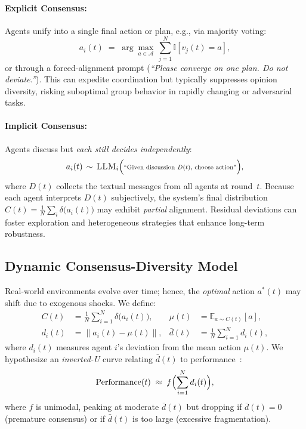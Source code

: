 \paragraph{Explicit Consensus:}
    Agents unify into a single final action or plan, e.g., via majority voting:
    \begin{equation}
    a_i(t) \;=\; \arg\max_{a\in\mathcal{A}} \,\sum_{j=1}^N \mathbb{I}[v_j(t) = a],
    \end{equation}
    or through a forced-alignment prompt (\emph{“Please converge on one plan. Do not deviate.”}). This can expedite coordination but typically suppresses opinion diversity, risking suboptimal group behavior in rapidly changing or adversarial tasks.

\paragraph{Implicit Consensus:}
    Agents discuss but \emph{each still decides independently}:
    \begin{equation}
    a_i(t) \,\sim\, \textsc{LLM}_i\Bigl(\scriptstyle\text{``Given discussion } D(t)\text{, choose action''}\Bigr),
    \end{equation}
    where $D(t)$ collects the textual messages from all agents at round~$t$. Because each agent interprets $D(t)$ subjectively, the system’s final distribution $C(t) = \tfrac{1}{N}\sum_i \delta\bigl(a_i(t)\bigr)$ may exhibit \emph{partial} alignment. Residual deviations can foster exploration and heterogeneous strategies that enhance long-term robustness.

\subsection{Dynamic Consensus-Diversity Model}
Real-world environments evolve over time; hence, the \emph{optimal} action $a^*(t)$ may shift due to exogenous shocks. We define:
\begin{align}
C(t) &= \tfrac{1}{N}\sum_{i=1}^N \delta\bigl(a_i(t)\bigr), 
&\mu(t) &= \mathbb{E}_{a \sim C(t)}[a], \\
d_i(t) &= \lVert a_i(t) - \mu(t)\rVert, 
&\bar{d}(t) &= \tfrac{1}{N}\sum_{i=1}^N d_i(t),
\end{align}
where $d_i(t)$ measures agent $i$’s deviation from the mean action $\mu(t)$. We hypothesize an \emph{inverted-U} curve relating \(\bar{d}(t)\) to performance~\cite{curșeu2017stakeholder, shang2019resilient}:
\[
\text{Performance}(t) \;\approx\; f\Bigl(\sum_{i=1}^N d_i(t)\Bigr),
\]
where $f$ is unimodal, peaking at moderate $\bar{d}(t)$ but dropping if $\bar{d}(t)=0$ (premature consensus) or if $\bar{d}(t)$ is too large (excessive fragmentation).


